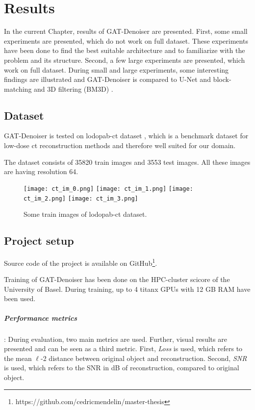 \chapter{Results}
\label{sec:results}

In the current Chapter, results of GAT-Denoiser are presented.
First, some small experiments are presented, which do not work on full dataset.
These experiments have been done to find the best suitable architecture and to 
familiarize with the problem and its structure.
Second, a few large experiments are presented, which work on full dataset.
During small and large experiments, some interesting findings are illustrated and GAT-Denoiser
is compared to U-Net and block-matching and 3D filtering (BM3D) \cite{bm3d}.


\section{Dataset}
GAT-Denoiser is tested on lodopab-ct dataset \cite{lodopab-dataset}, which is a 
benchmark dataset for low-dose ct reconstruction methods and therefore well suited for our domain.

The dataset consists of 35820 train images and 3553 test images.
All these images are having resolution 64.

\begin{figure}[H]
  \centering
  \hfill
  \texttt{[image: ct\_im\_0.png]}
  \hfill
  \texttt{[image: ct\_im\_1.png]}
  \hfill
  \texttt{[image: ct\_im\_2.png]}
  \hfill
  \texttt{[image: ct\_im\_3.png]}
  \hfill
  \caption{Some train images of lodopab-ct dataset.}
\end{figure}



\section{Project setup}
Source code of the project is available on GitHub\footnote{https://github.com/cedricmendelin/master-thesis}.

Training of GAT-Denoiser has been done on the HPC-cluster scicore of the University of Basel.
During training, up to 4 titanx GPUs with 12 GB RAM have been used.

\paragraph{Performance metrics}:
During evaluation, two main metrics are used. Further, visual results are presented and can be seen as a third metric.
First, \textit{Loss} is used, which refers to the mean $\ell$-2 distance between original object and reconstruction.
Second, \textit{SNR} is used, which refers to the SNR in dB of reconstruction, compared to original object.

